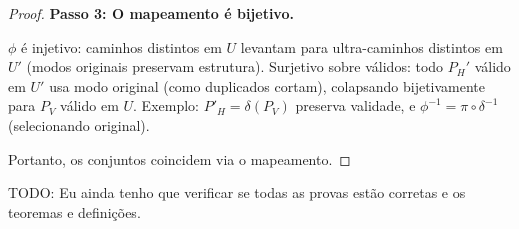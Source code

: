 \documentclass{article}
\begin{document}
\begin{proof}
\textbf{Passo 3: O mapeamento é bijetivo.}

\( \phi \) é injetivo: caminhos distintos em \( U \) levantam para ultra-caminhos distintos em \( U' \) (modos originais preservam estrutura). Surjetivo sobre válidos: todo \( P_H' \) válido em \( U' \) usa modo original (como duplicados cortam), colapsando bijetivamente para \( P_V \) válido em \( U \). Exemplo: \( P'_H = \delta(P_V) \) preserva validade, e \( \phi^{-1} = \pi \circ \delta^{-1} \) (selecionando original).

Portanto, os conjuntos coincidem via o mapeamento.
\end{proof}
\bigskip

TODO: Eu ainda tenho que verificar se todas as provas estão corretas e os teoremas e definições.
\end{document}
